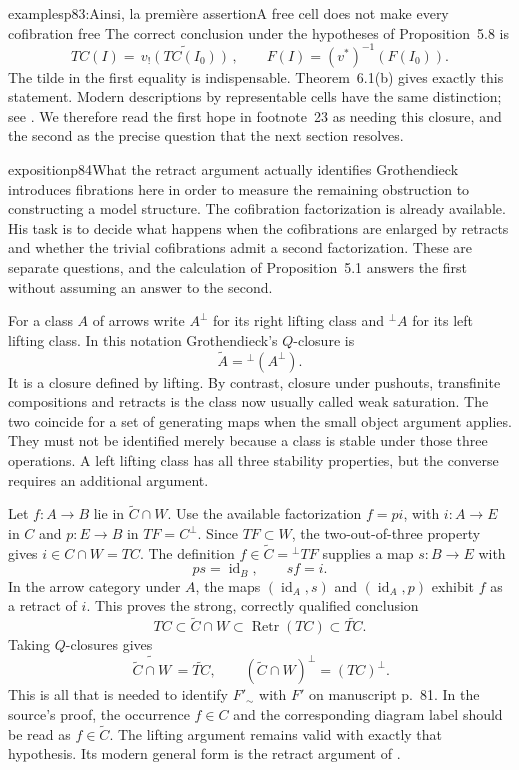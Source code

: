 \begin{dcomment}{examples}{p83:Ainsi, la première assertion}{A free cell does not make every cofibration free}
The correct conclusion under the hypotheses of Proposition~5.8 is
\[
 TC(I)=\widetilde{\,v_!(TC(I_0))\,},
 \qquad F(I)=(v^*)^{-1}(F(I_0)).
\]
The tilde in the first equality is indispensable. Theorem~6.1(b) gives exactly this statement. Modern descriptions by representable cells have the same distinction; see \citet[Theorem~12.3.2]{Riehl2014}. We therefore read the first hope in footnote~23 as needing this closure, and the second as the precise question that the next section resolves.
\end{dcomment}

\begin{dcomment}{exposition}{p84}{What the retract argument actually identifies}
Grothendieck introduces fibrations here in order to measure the remaining obstruction to constructing a model structure. The cofibration factorization is already available. His task is to decide what happens when the cofibrations are enlarged by retracts and whether the trivial cofibrations admit a second factorization. These are separate questions, and the calculation of Proposition~5.1 answers the first without assuming an answer to the second.

For a class $A$ of arrows write $A^{\perp}$ for its right lifting class and ${}^{\perp}A$ for its left lifting class. In this notation Grothendieck's $Q$-closure is
\[
 \widetilde A={}^{\perp}(A^{\perp}).
\]
It is a closure defined by lifting. By contrast, closure under pushouts, transfinite compositions and retracts is the class now usually called weak saturation. The two coincide for a set of generating maps when the small object argument applies. They must not be identified merely because a class is stable under those three operations. A left lifting class has all three stability properties, but the converse requires an additional argument.

Let $f:A\to B$ lie in $\widetilde C\cap W$. Use the available factorization $f=pi$, with $i:A\to E$ in $C$ and $p:E\to B$ in $TF=C^{\perp}$. Since $TF\subset W$, the two-out-of-three property gives $i\in C\cap W=TC$. The definition $f\in\widetilde C={}^{\perp}TF$ supplies a map $s:B\to E$ with
\[
 ps=\operatorname{id}_B,\qquad sf=i.
\]
In the arrow category under $A$, the maps $(\operatorname{id}_A,s)$ and $(\operatorname{id}_A,p)$ exhibit $f$ as a retract of $i$. This proves the strong, correctly qualified conclusion
\[
 TC\subset\widetilde C\cap W
       \subset\operatorname{Retr}(TC)
       \subset\widetilde{TC}.
\]
Taking $Q$-closures gives
\[
 \widetilde{\,\widetilde C\cap W\,}=\widetilde{TC},
 \qquad (\widetilde C\cap W)^{\perp}=(TC)^{\perp}.
\]
This is all that is needed to identify $F'_{\sim}$ with $F'$ on manuscript p.~81. In the source's proof, the occurrence $f\in C$ and the corresponding diagram label should be read as $f\in\widetilde C$. The lifting argument remains valid with exactly that hypothesis. Its modern general form is the retract argument of \citet[Lemma~11.2.3]{Riehl2014}.


\end{dcomment}
